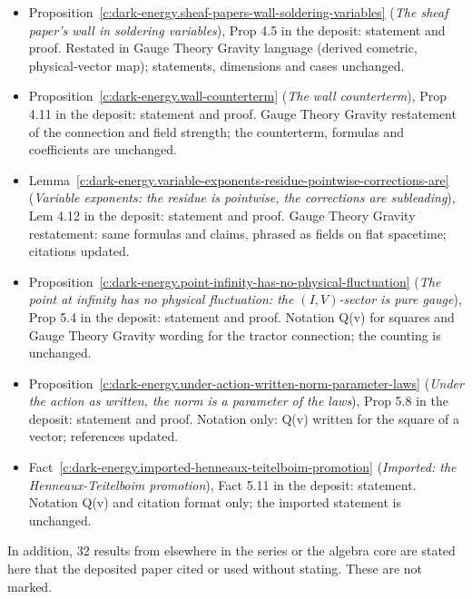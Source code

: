 \documentclass[11pt]{article}
\theoremstyle{definition}
\theoremstyle{plain}
\begin{document}
\begin{itemize}
\item Proposition~\ref{c:dark-energy.sheaf-papers-wall-soldering-variables} (\emph{The sheaf paper's wall in soldering variables}), Prop 4.5 in the deposit: statement and proof. Restated in Gauge Theory Gravity language (derived cometric, physical-vector map); statements, dimensions and cases unchanged.
\item Proposition~\ref{c:dark-energy.wall-counterterm} (\emph{The wall counterterm}), Prop 4.11 in the deposit: statement and proof. Gauge Theory Gravity restatement of the connection and field strength; the counterterm, formulas and coefficients are unchanged.
\item Lemma~\ref{c:dark-energy.variable-exponents-residue-pointwise-corrections-are} (\emph{Variable exponents: the residue is pointwise, the corrections are subleading}), Lem 4.12 in the deposit: statement and proof. Gauge Theory Gravity restatement: same formulas and claims, phrased as fields on flat spacetime; citations updated.
\item Proposition~\ref{c:dark-energy.point-infinity-has-no-physical-fluctuation} (\emph{The point at infinity has no physical fluctuation: the $(I,V)$-sector is pure gauge}), Prop 5.4 in the deposit: statement and proof. Notation Q(v) for squares and Gauge Theory Gravity wording for the tractor connection; the counting is unchanged.
\item Proposition~\ref{c:dark-energy.under-action-written-norm-parameter-laws} (\emph{Under the action as written, the norm is a parameter of the laws}), Prop 5.8 in the deposit: statement and proof. Notation only: Q(v) written for the square of a vector; references updated.
\item Fact~\ref{c:dark-energy.imported-henneaux-teitelboim-promotion} (\emph{Imported: the Henneaux-Teitelboim promotion}), Fact 5.11 in the deposit: statement. Notation Q(v) and citation format only; the imported statement is unchanged.
\end{itemize}
\noindent In addition, 32 results from elsewhere in the series or the algebra core are stated here that the deposited paper cited or used without stating. These are not marked.
\end{document}
